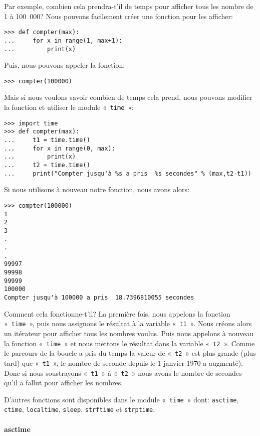 Par exemple, combien cela prendra-t'il de temps pour afficher tous les nombre de 1 à 100~000?  Nous pouvons facilement créer une fonction pour les afficher:
\begin{Verbatim}[frame=single,rulecolor=\color{gray}]
>>> def compter(max):
...     for x in range(1, max+1):
...         print(x)
\end{Verbatim}

Puis, nous pouvons appeler la fonction:
\begin{Verbatim}[frame=single,rulecolor=\color{gray}]
>>> compter(100000)
\end{Verbatim}

Mais si nous voulons savoir combien de temps cela prend, nous pouvons modifier la fonction et utiliser le module  «~\texttt{time}~»:

\begin{Verbatim}[frame=single,rulecolor=\color{gray}]
>>> import time
>>> def compter(max):
...     t1 = time.time()
...     for x in range(0, max):
...         print(x)
...     t2 = time.time()
...     print("Compter jusqu'à %s a pris  %s secondes" % (max,t2-t1))
\end{Verbatim}

Si nous utilisons à nouveau notre fonction, nous avons alors:

\begin{Verbatim}[frame=single,rulecolor=\color{gray}]
>>> compter(100000)
1
2
3
.
.
.
99997
99998
99999
100000
Compter jusqu'à 100000 a pris  18.7396810055 secondes
\end{Verbatim}

Comment cela fonctionne-t'il? La première fois, nous appelons la fonction «~\texttt{time}~», puis nous assignons le résultat à la variable «~\texttt{t1}~». Nous créons alors un itérateur pour afficher tous les nombres voulus. Puis nous appelons à nouveau la fonction «~\texttt{time}~» et nous mettons le résultat dans la variable «~\texttt{t2}~». Comme le parcours de la boucle a pris du temps la valeur de «~\texttt{t2}~» est plus grande (plus tard) que «~\texttt{t1}~», le nombre de seconde depuis  le 1 janvier 1970 a augmenté). Donc si nous soustrayons «~\texttt{t1}~» à «~\texttt{t2}~» nous avons le nombre de secondes qu'il a fallut pour afficher les nombres.

D'autres fonctions sont disponibles dans le module «~\texttt{time}~» dont: \verb+asctime+, \verb+ctime+, \verb+localtime+, \verb+sleep+, \verb+strftime+ et \verb+strptime+.

\paragraph{asctime}


